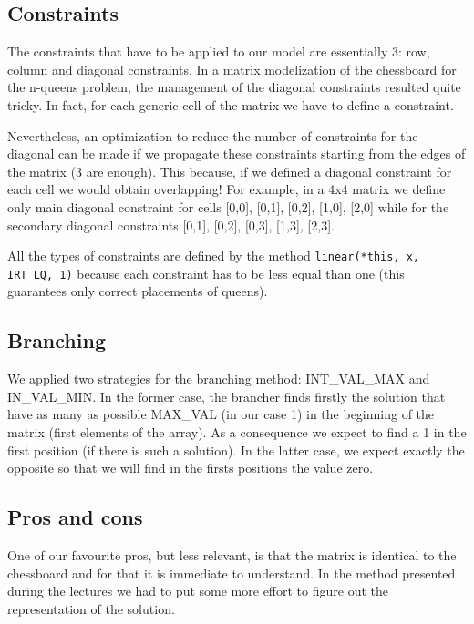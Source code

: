 \documentclass[a4paper, 11pt]{article}
\begin{document}
\subsection{Constraints}

The constraints that have to be applied to our model are essentially
3: row, column and diagonal constraints. In a matrix modelization of
the chessboard for the n-queens problem, the management of the
diagonal constraints resulted quite tricky. In fact, for each generic
cell of the matrix we have to define a constraint.

Nevertheless, an optimization to reduce the number of constraints for
the diagonal can be made if we propagate these constraints starting
from the edges of the matrix (3 are enough). This because, if we
defined a diagonal constraint for each cell we would obtain
overlapping! For example, in a 4x4 matrix we define only main diagonal
constraint for cells [0,0], [0,1], [0,2], [1,0], [2,0] while for the
secondary diagonal constraints [0,1], [0,2], [0,3], [1,3], [2,3].

All the types of constraints are defined by the method
\texttt{linear(*this, x, IRT\_LQ, 1)} because each constraint has to
be less equal than one (this guarantees only correct placements of
queens).

\subsection{Branching}

We applied two strategies for the branching method: INT\_VAL\_MAX and
IN\_VAL\_MIN. In the former case, the brancher finds firstly the
solution that have as many as possible MAX\_VAL (in our case 1) in the
beginning of the matrix (first elements of the array). As a
consequence we expect to find a 1 in the first position (if there is
such a solution). In the latter case, we expect exactly the opposite
so that we will find in the firsts positions the value zero.

\subsection{Pros and cons}

One of our favourite pros, but less relevant, is that the matrix is
identical to the chessboard and for that it is immediate to
understand. In the method presented during the lectures we had to put
some more effort to figure out the representation of the solution.
\end{document}
